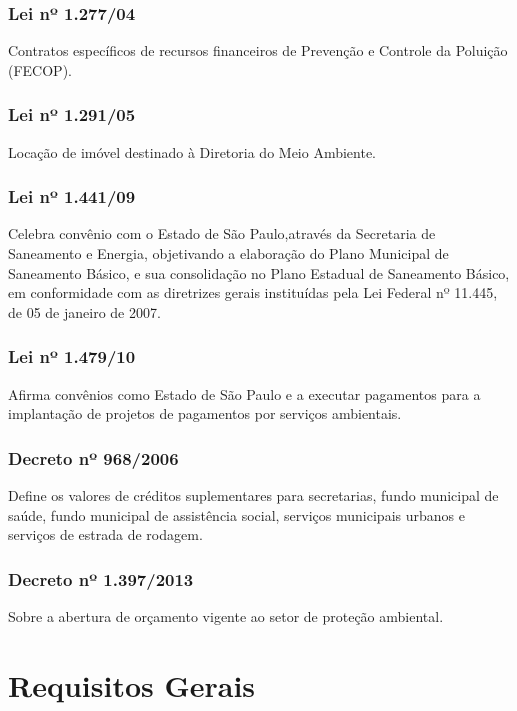 \begin{subapend}
\begin{subsubapend}
 		\subsubsection{Lei nº 1.277/04}
 		Contratos específicos de recursos financeiros de Prevenção e Controle da Poluição (FECOP).
 		\subsubsection{Lei nº 1.291/05}
 		Locação de imóvel destinado à Diretoria do Meio Ambiente.
 		\subsubsection{Lei nº 1.441/09}
 		Celebra convênio com o Estado de São Paulo,através da Secretaria de Saneamento e Energia, objetivando a elaboração do Plano Municipal de Saneamento Básico, e sua consolidação no Plano Estadual de Saneamento Básico, em conformidade com as diretrizes gerais instituídas pela Lei Federal nº 11.445, de 05 de janeiro de 2007.
 		\subsubsection{Lei nº 1.479/10}
 		Afirma convênios como Estado de São Paulo e a executar pagamentos para a implantação de projetos de pagamentos por serviços ambientais.
 		\subsubsection{Decreto nº 968/2006}
 		Define os valores de créditos suplementares para secretarias, fundo municipal de saúde, fundo municipal de assistência social, serviços municipais urbanos e serviços de estrada de rodagem.
 		\subsubsection{Decreto nº 1.397/2013}
 		Sobre a abertura de orçamento vigente ao setor de proteção ambiental.
 	\end{subsubapend}
 \end{subapend}

\section{Requisitos Gerais}

